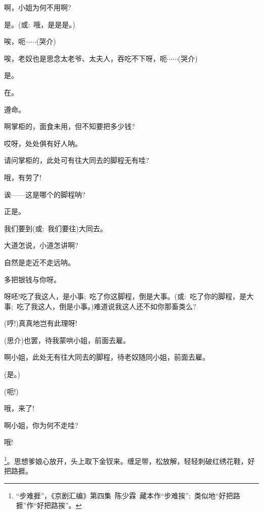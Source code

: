 {{啊，小姐为何不用啊?}

{是。({\akai 或}:~哦，是是是。)}

{唉，呃$\cdots{}\cdots{}$({\hwfs 哭介})}

{唉，老奴也是思念太老爷、太夫人，吞吃不下呀，呃$\cdots{}\cdots{}$({\hwfs 哭介})}

{是。}

{在。}

{遵命。}

{啊掌柜的，面食未用，但不知要把多少钱?}

{哎呀，处处俱有好人呐。}

{请问掌柜的，此处可有往大同去的脚程无有哇?}

{哦，有劳了!}

{诶------这是哪个的脚程呐?}

{正是。}

{我们要到({\akai 或}:~我们要往)大同去。}

{大道怎说，小道怎讲啊?}

{自然是走近不走远呐。}

{多把银钱与你呀。}

{呀呸!吃了我这人，是小事;~吃了你这脚程，倒是大事。({\akai 或}:~吃了你的脚程，是大事;~吃了我这人，倒是小事。)难道说我这人还不如你那畜类么?}

{(哼!)真真地岂有此理呀!}

{({\hwfs 思介})也罢，待我蒙哄小姐，前面去雇。}

{啊小姐，此处无有往大同去的脚程，待老奴随同小姐，前面去雇。}

{(是。)}

{(呃!)}



{哦，来了!}

{\vspace{5pt}}

{啊小姐，你为何不走哇?}

{哦!}

\footnote{``步难捱''，《京剧汇编》第四集~陈少霖~藏本作``步难挨'';~类似地``好把路捱''作``好把路挨''。}{。思想爹娘心放开，头上取下金钗来。缠足带，松放解，轻轻刺破红绣花鞋，好把路捱。}

}
